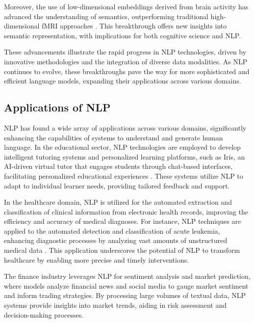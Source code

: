 Moreover, the use of low-dimensional embeddings derived from brain activity has advanced the understanding of semantics, outperforming traditional high-dimensional fMRI approaches \cite{raposo2019lowdimensionalembodiedsemanticsmusic}. This breakthrough offers new insights into semantic representation, with implications for both cognitive science and NLP.



These advancements illustrate the rapid progress in NLP technologies, driven by innovative methodologies and the integration of diverse data modalities. As NLP continues to evolve, these breakthroughs pave the way for more sophisticated and efficient language models, expanding their applications across various domains.



\subsection{Applications of NLP} \label{subsec:Applications of NLP}



NLP has found a wide array of applications across various domains, significantly enhancing the capabilities of systems to understand and generate human language. In the educational sector, NLP technologies are employed to develop intelligent tutoring systems and personalized learning platforms, such as Iris, an AI-driven virtual tutor that engages students through chat-based interfaces, facilitating personalized educational experiences \cite{bassner2024irisaidrivenvirtualtutor}. These systems utilize NLP to adapt to individual learner needs, providing tailored feedback and support.



In the healthcare domain, NLP is utilized for the automated extraction and classification of clinical information from electronic health records, improving the efficiency and accuracy of medical diagnoses. For instance, NLP techniques are applied to the automated detection and classification of acute leukemia, enhancing diagnostic processes by analyzing vast amounts of unstructured medical data \cite{zolfaghari2023surveyautomateddetectionclassification}. This application underscores the potential of NLP to transform healthcare by enabling more precise and timely interventions.



The finance industry leverages NLP for sentiment analysis and market prediction, where models analyze financial news and social media to gauge market sentiment and inform trading strategies. By processing large volumes of textual data, NLP systems provide insights into market trends, aiding in risk assessment and decision-making processes.



